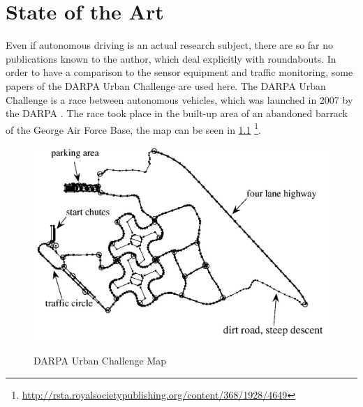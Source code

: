 \documentclass[11pt,oneside,openright]{mpreport}
\begin{document}
\chapter{State of the Art}
Even if autonomous driving is an actual research subject, there are so far no publications known to the author, which deal explicitly with roundabouts.
In order to have a comparison to the sensor equipment and traffic monitoring, some papers of the \acs{DARPA} Urban Challenge are used here. 
The DARPA Urban Challenge is a race between autonomous vehicles, which was launched in 2007 by the \ac{DARPA} \cite {Buehler2010}.
The race took place in the built-up area of an abandoned barrack of the George Air Force Base, the map can be seen in \cref{darpa_map}
\footnote{\url{http://rsta.royalsocietypublishing.org/content/368/1928/4649}}.

\begin{figure}[!ht]
\caption{ \acs{DARPA} Urban Challenge Map }
\includegraphics[width=\textwidth]{bilder/darpa_map_bw.png}
\label{darpa_map}
\end{figure}
\end{document}
